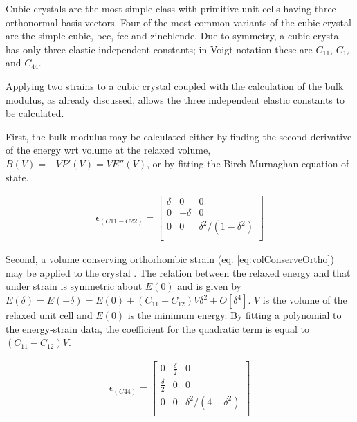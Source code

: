 Cubic crystals are the most simple class with primitive unit cells having three orthonormal basis vectors.  Four of the most common variants of the cubic crystal are the simple cubic, \acrlong{bcc}, \acrlong{fcc} and zincblende.  Due to symmetry, a cubic crystal has only three elastic independent constants; in Voigt notation these are $C_{11}$, $C_{12}$ and $C_{44}$.

Applying two strains to a cubic crystal \cite{pressuredepmehl} coupled with the calculation of the bulk modulus, as already discussed, allows the three independent elastic constants to be calculated.

First, the bulk modulus may be calculated either by finding the second derivative of the energy wrt volume at the relaxed volume, $B(V) = -V P'(V) = V E''(V)$\cite{pressuredepmehl}, or by fitting the Birch-Murnaghan equation of state.

\begin{equation}
  \begin{split}
    \epsilon_{(C11 - C22)} = 
    \begin{bmatrix}
    \delta & 0 & 0   \\
    0 & - \delta & 0   \\
    0 & 0 & \delta^2 / (1 - \delta^2)   \\
    \end{bmatrix}
  \end{split}
  \label{eq:volConserveOrtho}
\end{equation}

Second, a volume conserving orthorhombic strain (eq. \ref{eq:volConserveOrtho}) may be applied to the crystal \cite{pressuredepmehl}.  The relation between the relaxed energy and that under strain is symmetric about $E(0)$ and is given by $E(\delta) = E(-\delta) = E(0) + (C_{11} - C_{12}) V \delta^2 + O[\delta^4]$\cite{pressuredepmehl}.  $V$ is the volume of the relaxed unit cell and $E(0)$ is the minimum energy.  By fitting a polynomial to the energy-strain data, the coefficient for the quadratic term is equal to $(C_{11} - C_{12}) V$.

  \begin{equation}
    \begin{split}
      \epsilon_{(C44)} = 
      \begin{bmatrix}
      0 & \frac{\delta}{2} & 0   \\
       \frac{\delta}{2} & 0 & 0   \\
      0 & 0 & \delta^2 / (4 - \delta^2)   \\
      \end{bmatrix}
    \end{split}
    \label{eq:monoclinicstrain}
  \end{equation}

